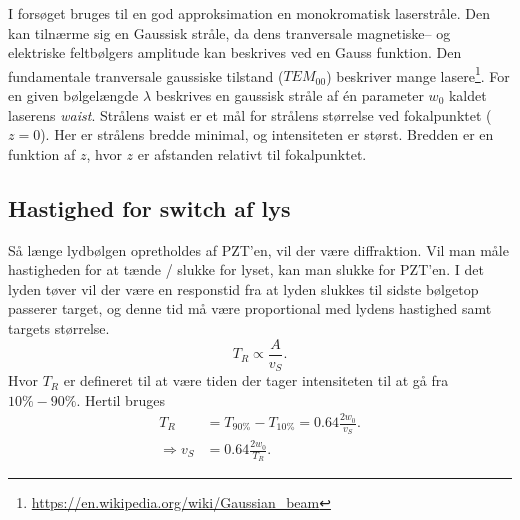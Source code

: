 \documentclass[main]{subfiles}
\begin{document}
I forsøget bruges til en god approksimation en monokromatisk laserstråle. Den kan tilnærme sig en Gaussisk stråle, da dens tranversale magnetiske-- og elektriske feltbølgers amplitude kan beskrives ved en Gauss funktion. Den fundamentale tranversale gaussiske tilstand ($TEM_{00}$) beskriver mange lasere\footnote{\url{https://en.wikipedia.org/wiki/Gaussian_beam}}. For en given bølgelængde $\lambda$ beskrives en gaussisk stråle af én parameter $w_0$ kaldet laserens \emph{waist}. Strålens waist er et mål for strålens størrelse ved fokalpunktet ($z=0$). Her er strålens bredde minimal, og intensiteten er størst. Bredden er en funktion af $z$, hvor $z$ er afstanden relativt til fokalpunktet.

\subsection{Hastighed for switch af lys}
Så længe lydbølgen opretholdes af PZT'en, vil der være diffraktion. Vil man måle hastigheden for at tænde / slukke for lyset, kan man slukke for PZT'en. I det lyden tøver vil der være en responstid fra at lyden slukkes til sidste bølgetop passerer target, og denne tid må være proportional med lydens hastighed samt targets størrelse.
\begin{equation}
    T_R \propto \frac{A}{v_S}.
\end{equation}
Hvor $T_R$ er defineret til at være tiden der tager intensiteten til at gå fra $ 10\% - 90\%$.  Hertil bruges
\begin{align}
    T_R & = T_{90\%} - T_{10\%} = 0.64 \frac{2w_0}{v_S}.\label{eq:risetime} \\
    \Rightarrow v_S & = 0.64 \frac{2w_0}{T_R}.    \label{eq:risetimeIsolere}
\end{align}
\end{document}
